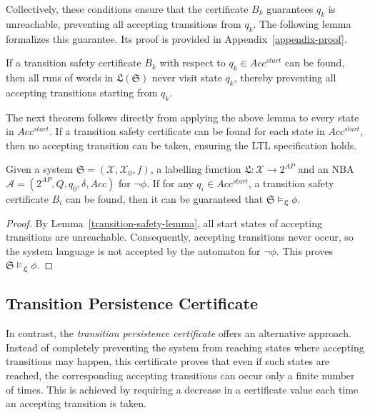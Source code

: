 Collectively, these conditions ensure that the certificate $B_k$ guarantees $q_k$ is unreachable, preventing all accepting transitions from $q_k$. The following lemma formalizes this guarantee. Its proof is provided in Appendix~\ref{appendix-proof}.

\begin{lemma}
  \label{transition-safety-lemma}
  If a transition safety certificate $B_k$ with respect to $q_k \in Acc^{start}$ can be found, then all runs of words in $\mathfrak{L}(\mathfrak{S})$ never visit state $q_k$, thereby preventing all accepting transitions starting from $q_k$.
\end{lemma}

The next theorem follows directly from applying the above lemma to every state in $Acc^{start}$. If a transition safety certificate can be found for each state in $Acc^{start}$, then no accepting transition can be taken, ensuring the LTL specification holds.

\begin{theorem}
  \label{transition-safety-LTL}
  Given a system $\mathfrak{S} = (\mathcal{X}, \mathcal{X}_0, f)$, a labelling function $\mathfrak{L}:\mathcal{X} \rightarrow 2^{AP}$ and an NBA $\mathcal{A} = (2^{AP}, Q, q_0, \delta, Acc)$ for $\neg\phi$. If for any $q_i \in Acc^{start}$, a transition safety certificate $B_i$ can be found, then it can be guaranteed that $\mathfrak{S} \models_{\mathfrak{L}} \phi$.
\end{theorem}

\begin{proof}
By Lemma~\ref{transition-safety-lemma}, all start states of accepting transitions are unreachable. Consequently, accepting transitions never occur, so the system language is not accepted by the automaton for $\neg\phi$. This proves $\mathfrak{S} \models_{\mathfrak{L}} \phi$.
\end{proof}

\subsection{Transition Persistence Certificate}
In contrast, the \emph{transition persistence certificate} offers an alternative approach. Instead of completely preventing the system from reaching states where accepting transitions may happen, this certificate proves that even if such states are reached, the corresponding accepting transitions can occur only a finite number of times. This is achieved by requiring a decrease in a certificate value each time an accepting transition is taken.

